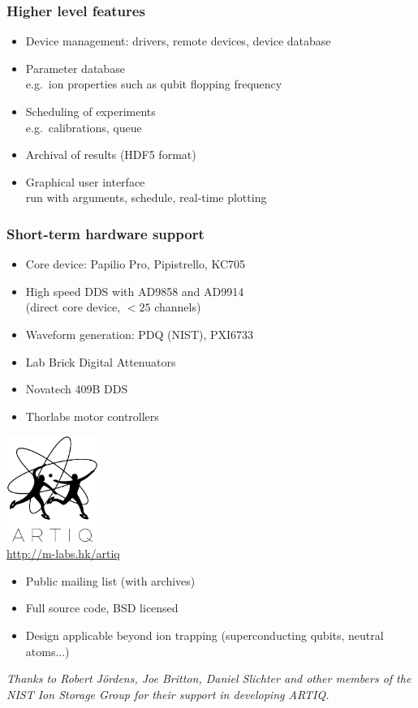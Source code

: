 \documentclass[final,presentation,compress]{beamer}
\begin{document}
\begin{frame}
  \frametitle{Higher level features}
  \footnotesize
  \begin{itemize}
  \item Device management: drivers, remote devices, device database
  \item Parameter database \\
       e.g.\ ion properties such as qubit flopping frequency
  \item Scheduling of experiments \\
      e.g.\ calibrations, queue
  \item Archival of results (HDF5 format)
  \item Graphical user interface \\
  	run with arguments, schedule, real-time plotting
  \end{itemize}
\end{frame}


\begin{frame}
  \frametitle{Short-term hardware support}
  \footnotesize
  \begin{itemize}
  \item Core device: Papilio Pro, Pipistrello, KC705
  \item High speed DDS with AD9858 and AD9914 \\
  	(direct core device, $ < 25$ channels)
  \item Waveform generation: PDQ (NIST), PXI6733
  \item Lab Brick Digital Attenuators
  \item Novatech 409B DDS
  \item Thorlabs motor controllers
  \end{itemize}
\end{frame}

\begin{frame}
  \begin{center}
  \includegraphics[width=3cm]{../../logo/artiq.pdf} \\
  \url{http://m-labs.hk/artiq}
  \end{center}

  \footnotesize
  \begin{itemize}
    \item Public mailing list (with archives)
    \item Full source code, BSD licensed
    \item Design applicable beyond ion trapping (superconducting qubits,
      neutral atoms...)
  \end{itemize}
  \textit{Thanks to Robert J\"ordens, Joe Britton, Daniel Slichter and other members of the NIST Ion Storage Group for their support in developing ARTIQ.}

\end{frame}
\end{document}
